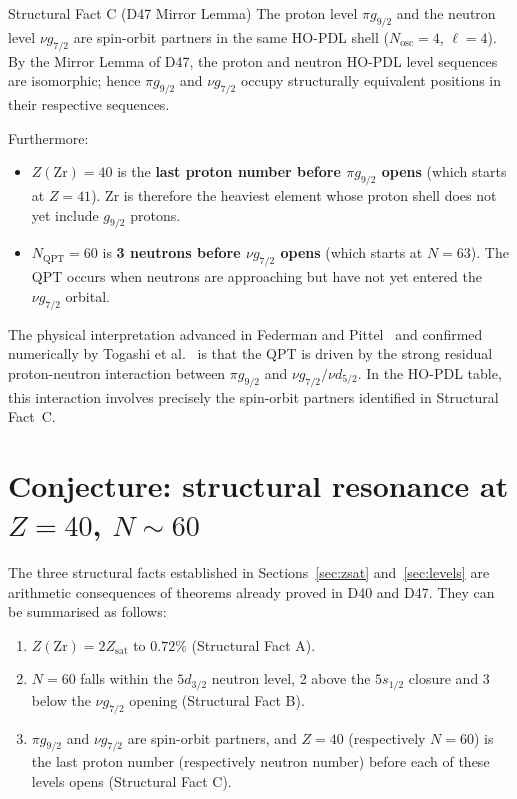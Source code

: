 \documentclass[11pt,a4paper]{article}
\theoremstyle{definition}
\theoremstyle{remark}
\newcommand{\Zsat}{Z_{\mathrm{sat}}}
\newcommand{\MQPT}{N_{\mathrm{QPT}}}
\begin{document}
\begin{pdltheorem}{Structural Fact C (D47 Mirror Lemma)}
The proton level $\pi g_{9/2}$ and the neutron level $\nu g_{7/2}$ are spin-orbit partners in the same HO-PDL shell ($N_{\mathrm{osc}} = 4$, $\ell = 4$). By the Mirror Lemma of D47, the proton and neutron HO-PDL level sequences are isomorphic; hence $\pi g_{9/2}$ and $\nu g_{7/2}$ occupy structurally equivalent positions in their respective sequences.
\end{pdltheorem}

Furthermore:
\begin{itemize}
  \item $Z(\mathrm{Zr}) = 40$ is the \textbf{last proton number before $\pi g_{9/2}$ opens} (which starts at $Z=41$). Zr is therefore the heaviest element whose proton shell does not yet include $g_{9/2}$ protons.
  \item $\MQPT = 60$ is \textbf{3 neutrons before $\nu g_{7/2}$ opens} (which starts at $N=63$). The QPT occurs when neutrons are approaching but have not yet entered the $\nu g_{7/2}$ orbital.
\end{itemize}

The physical interpretation advanced in Federman and Pittel~\cite{Federman_1977} and confirmed numerically by Togashi et al.~\cite{Togashi_2016} is that the QPT is driven by the strong residual proton-neutron interaction between $\pi g_{9/2}$ and $\nu g_{7/2}/\nu d_{5/2}$. In the HO-PDL table, this interaction involves precisely the spin-orbit partners identified in Structural Fact~C.

\section{Conjecture: structural resonance at \texorpdfstring{$Z=40$, $N\sim 60$}{Z=40, N~60}}
\label{sec:conjecture}

The three structural facts established in Sections~\ref{sec:zsat} and~\ref{sec:levels} are arithmetic consequences of theorems already proved in D40 and D47. They can be summarised as follows:

\begin{enumerate}
  \item $Z(\mathrm{Zr}) = 2\Zsat$ to $0.72\%$ (Structural Fact A).
  \item $N=60$ falls within the $5d_{3/2}$ neutron level, 2 above the $5s_{1/2}$ closure and 3 below the $\nu g_{7/2}$ opening (Structural Fact B).
  \item $\pi g_{9/2}$ and $\nu g_{7/2}$ are spin-orbit partners, and $Z=40$ (respectively $N=60$) is the last proton number (respectively neutron number) before each of these levels opens (Structural Fact C).
\end{enumerate}
\end{document}
